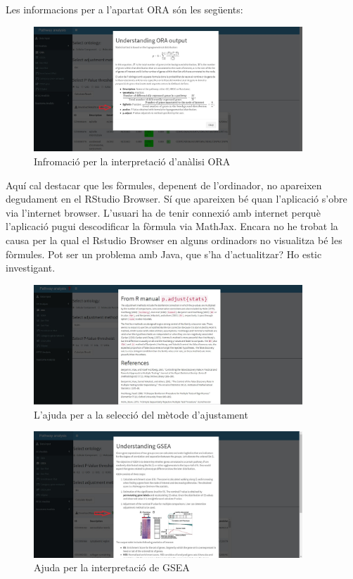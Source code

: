 Les informacions per a l'apartat ORA són les següents:

\begin{figure}[H]
\centering
\includegraphics[width=0.9\textwidth]{figures/Help_ORA_output.jpg} 
\caption{Infromació per la interpretació d'anàlisi ORA}
\end{figure}
Aquí cal destacar que les fòrmules, depenent de l'ordinador, no apareixen degudament en el RStudio Browser. Sí que apareixen bé quan l'aplicació s'obre via l’internet browser. L'usuari ha de tenir connexió amb internet perquè l'aplicació pugui descodificar la fòrmula via MathJax. Encara no he trobat la causa per la qual el Rstudio Browser en alguns ordinadors no visualitza bé les fòrmules. Pot ser un problema amb Java, que s'ha d'actualitzar? Ho estic investigant.

\begin{figure}[H]
\centering
\includegraphics[width=0.9\textwidth]{figures/Help_pAdjustMethod.jpg} 
\caption{L'ajuda per a la selecció del mètode d'ajustament}
\end{figure}


\begin{figure}[H]
\centering
\includegraphics[width=0.9\textwidth]{figures/Help_GSEA_output.jpg} 
\caption{Ajuda per la interpretació de GSEA}
\end{figure}


